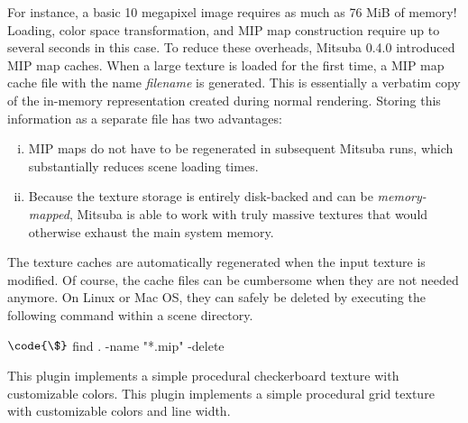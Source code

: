 For instance, a basic 10 megapixel image requires as much as 76 MiB of memory! Loading,
color space transformation, and MIP map construction require up to several seconds in this case.
To reduce these overheads, Mitsuba 0.4.0 introduced MIP map caches. When a large
texture is loaded for the first time, a MIP map cache file with the name \emph{filename}
is generated. This is essentially a verbatim copy of the in-memory representation created
during normal rendering. Storing this information as a separate file has two advantages:

\begin{enumerate}[(i)]
   \item MIP maps do not have to be regenerated in subsequent Mitsuba runs,
    which substantially reduces scene loading times.
   \item Because the texture storage is entirely disk-backed and can be \emph{memory-mapped},
   Mitsuba is able to work with truly massive textures that would otherwise exhaust the main system memory.
\end{enumerate}

The texture caches are automatically regenerated when the input texture is modified.
Of course, the cache files can be cumbersome when they are not needed anymore. On Linux
or Mac OS, they can safely be deleted by executing the following command within a scene directory.

\begin{shell}
$\code{\$}$ find . -name "*.mip" -delete
\end{shell}
This plugin implements a simple procedural checkerboard texture with
customizable colors.
This plugin implements a simple procedural grid texture with customizable
colors and line width.

